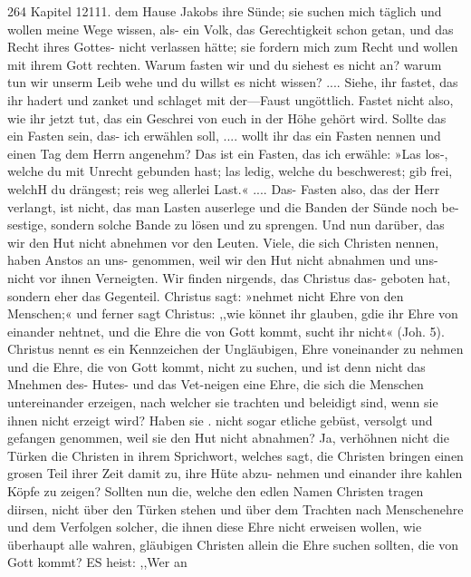 264 Kapitel 12111.
dem Hause Jakobs ihre Sünde; sie suchen mich täglich und wollen
meine Wege wissen, als- ein Volk, das Gerechtigkeit schon getan,
und das Recht ihres Gottes- nicht verlassen hätte; sie fordern
mich zum Recht und wollen mit ihrem Gott rechten. Warum
fasten wir und du siehest es nicht an? warum tun wir unserm
Leib wehe und du willst es nicht wissen? .... Siehe, ihr fastet,
das ihr hadert und zanket und schlaget mit der—Faust ungöttlich.
Fastet nicht also, wie ihr jetzt tut, das ein Geschrei von euch
in der Höhe gehört wird. Sollte das ein Fasten sein, das- ich
erwählen soll, .... wollt ihr das ein Fasten nennen und einen
Tag dem Herrn angenehm? Das ist ein Fasten, das ich erwähle:
»Las los-, welche du mit Unrecht gebunden hast; las ledig, welche
du beschwerest; gib frei, welchH du drängest; reis weg allerlei
Last.« .... Das- Fasten also, das der Herr verlangt, ist nicht,
das man Lasten auserlege und die Banden der Sünde noch be-
sestige, sondern solche Bande zu lösen und zu sprengen.
Und nun darüber, das wir den Hut nicht abnehmen vor den
Leuten. Viele, die sich Christen nennen, haben Anstos an uns-
genommen, weil wir den Hut nicht abnahmen und uns- nicht vor
ihnen Verneigten. Wir finden nirgends, das Christus das- geboten
hat, sondern eher das Gegenteil. Christus sagt: »nehmet nicht
Ehre von den Menschen;« und ferner sagt Christus: ,,wie könnet
ihr glauben, gdie ihr Ehre von einander nehtnet, und die Ehre
die von Gott kommt, sucht ihr nicht« (Joh. 5). Christus nennt
es ein Kennzeichen der Ungläubigen, Ehre voneinander zu nehmen
und die Ehre, die von Gott kommt, nicht zu suchen, und ist denn
nicht das Mnehmen des- Hutes- und das Vet-neigen eine Ehre, die
sich die Menschen untereinander erzeigen, nach welcher sie trachten
und beleidigt sind, wenn sie ihnen nicht erzeigt wird? Haben sie .
nicht sogar etliche gebüst, versolgt und gefangen genommen, weil
sie den Hut nicht abnahmen? Ja, verhöhnen nicht die Türken
die Christen in ihrem Sprichwort, welches sagt, die Christen
bringen einen grosen Teil ihrer Zeit damit zu, ihre Hüte abzu-
nehmen und einander ihre kahlen Köpfe zu zeigen? Sollten nun
die, welche den edlen Namen Christen tragen diirsen, nicht über
den Türken stehen und über dem Trachten nach Menschenehre
und dem Verfolgen solcher, die ihnen diese Ehre nicht erweisen
wollen, wie überhaupt alle wahren, gläubigen Christen allein die
Ehre suchen sollten, die von Gott kommt? ES heist: ,,Wer an


